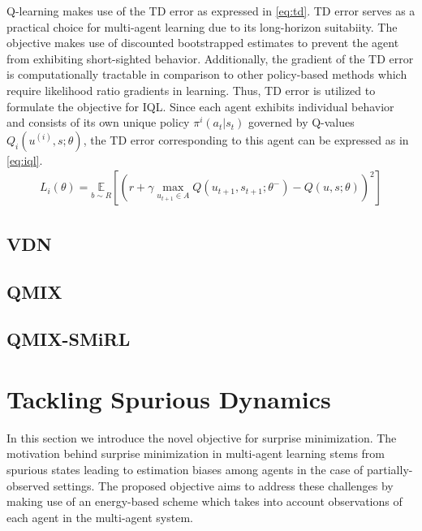 \documentclass{article}
\begin{document}
\begin{multicols}{2}
Q-learning makes use of the TD error as expressed in \autoref{eq:td}. TD error serves as a practical choice for multi-agent learning due to its long-horizon suitabiity. The objective makes use of discounted bootstrapped estimates to prevent the agent from exhibiting short-sighted behavior. Additionally, the gradient of the TD error is computationally tractable in comparison to other policy-based methods \cite{rl} which require likelihood ratio gradients in learning. Thus, TD error is utilized to formulate the objective for IQL. Since each agent exhibits individual behavior and consists of its own unique policy $\pi^{i}(a_{t}|s_{t})$ governed by Q-values $Q_{i}(u^{(i)},s;\theta)$, the TD error corresponding to this agent can be expressed as in \autoref{eq:iql}.
\begin{gather}
  L_{i}(\theta) = \underset{b \sim R}{\mathbb{E}}[(r + \gamma \underset{u_{t+1}\in A}{\max} Q(u_{t+1},s_{t+1};\theta^{-}) - Q(u,s;\theta))^{2}] \label{eq:iql}
\end{gather}


\subsection{VDN}

\subsection{QMIX}

\subsection{QMIX-SMiRL}


\section{Tackling Spurious Dynamics}
In this section we introduce the novel objective for surprise minimization. The motivation behind surprise minimization in multi-agent learning stems from spurious states leading to estimation biases among agents in the case of partially-observed settings. The proposed objective aims to address these challenges by making use of an energy-based scheme which takes into account observations of each agent in the multi-agent system. 


\end{multicols}
\end{document}
